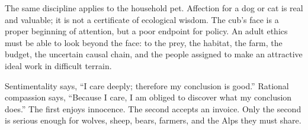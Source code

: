 ﻿\documentclass[12pt,a4paper]{book}
\begin{document}
The same discipline applies to the household pet.  Affection for a dog or cat
is real and valuable; it is not a certificate of ecological wisdom.  The cub's
face is a proper beginning of attention, but a poor endpoint for policy.  An
adult ethics must be able to look beyond the face: to the prey, the habitat,
the farm, the budget, the uncertain causal chain, and the people assigned to
make an attractive ideal work in difficult terrain.

Sentimentality says, ``I care deeply; therefore my conclusion is good.''
Rational compassion says, ``Because I care, I am obliged to discover what my
conclusion does.''  The first enjoys innocence.  The second accepts an invoice.
Only the second is serious enough for wolves, sheep, bears, farmers, and the
Alps they must share.





\end{document}
